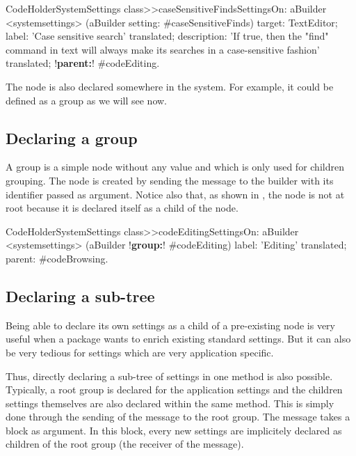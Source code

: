 \documentclass[a4paper,10pt,twoside]{book}
\begin{document}
\begin{code}{}
CodeHolderSystemSettings class>>caseSensitiveFindsSettingsOn: aBuilder
	<systemsettings>
	(aBuilder setting: #caseSensitiveFinds) 
		target: TextEditor;
		label: 'Case sensitive search' translated;
		description: 'If true, then the "find" command in text will always make its searches in a case-sensitive fashion' translated;
		!\textbf{parent:}! #codeEditing.
\end{code}
The  node is also declared somewhere in the system. For example, it could be defined as a group as we will see now. 


\subsection{Declaring a group}

A group is a simple node without any value and which is only used for children grouping.
The  node is created by sending the  message to the builder with its identifier passed as argument.  Notice also that, as shown in , the  node is not at root because it is declared itself as a child of the  node.


\begin{code}{}
CodeHolderSystemSettings class>>codeEditingSettingsOn: aBuilder
	<systemsettings>
	(aBuilder !\textbf{group:}! #codeEditing) 
		label: 'Editing' translated;
		parent: #codeBrowsing.
\end{code}


\subsection{Declaring a sub-tree}
Being able to declare its own settings as a child of a pre-existing node is very useful when a package wants to enrich existing standard settings. But it can also be very tedious for settings which are very application specific. 

Thus, directly declaring a sub-tree of settings in one method is also possible. Typically, a root group is declared for the application settings and the children settings themselves are also declared within the same method. This is simply done through the sending of the  message to the root group. The  message takes a block as argument. In this block, every new settings are implicitely declared as children of the root group (the receiver of the  message). 
\end{document}
